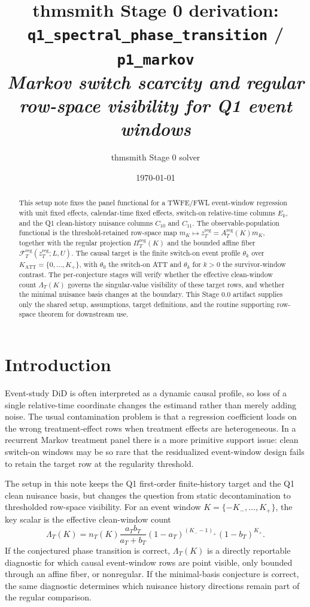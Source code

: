 \documentclass[11pt]{article}
\title{thmsmith Stage 0 derivation: \texttt{q1\_spectral\_phase\_transition} / \texttt{p1\_markov}%
  \\ \large\textit{Markov switch scarcity and regular row-space visibility for Q1 event windows}}
\author{thmsmith Stage 0 solver}
\date{\today}
\theoremstyle{definition}
\theoremstyle{plain}
\theoremstyle{remark}
\begin{document}
\maketitle


\begin{abstract}
This setup note fixes the panel functional for a TWFE/FWL event-window regression with unit fixed effects, calendar-time fixed effects, switch-on relative-time columns \(E_k\), and the Q1 clean-history nuisance columns \(C_{10}\) and \(C_{11}\).
The observable-population functional is the threshold-retained row-space map \(m_K\mapsto z_T^{\mathrm{reg}}=A_T^{\mathrm{reg}}(K)m_K\), together with the regular projection \(\Pi_T^{\mathrm{reg}}(K)\) and the bounded affine fiber \(\mathcal F_T^{\mathrm{reg}}(z_T^{\mathrm{reg}};L,U)\).
The causal target is the finite switch-on event profile \(\theta_k\) over \(K_{\mathrm{ATT}}=\{0,\ldots,K_+\}\), with \(\theta_0\) the switch-on ATT and \(\theta_k\) for \(k>0\) the survivor-window contrast.
The per-conjecture stages will verify whether the effective clean-window count \(\Lambda_T(K)\) governs the singular-value visibility of these target rows, and whether the minimal nuisance basis changes at the boundary.
This Stage 0.0 artifact supplies only the shared setup, assumptions, target definitions, and the routine supporting row-space theorem for downstream use.
\end{abstract}

\section{Introduction}
Event-study DiD is often interpreted as a dynamic causal profile, so loss of a single relative-time coordinate changes the estimand rather than merely adding noise.
The usual contamination problem is that a regression coefficient loads on the wrong treatment-effect rows when treatment effects are heterogeneous.
In a recurrent Markov treatment panel there is a more primitive support issue: clean switch-on windows may be so rare that the residualized event-window design fails to retain the target row at the regularity threshold.

The setup in this note keeps the Q1 first-order finite-history target and the Q1 clean nuisance basis, but changes the question from static decontamination to thresholded row-space visibility.
For an event window \(K=\{-K_-,\ldots,K_+\}\), the key scalar is the effective clean-window count
\[
\Lambda_T(K)=n_T(K)\frac{a_Tb_T}{a_T+b_T}(1-a_T)^{(K_- -1)_+}(1-b_T)^{K_+}.
\]
If the conjectured phase transition is correct, \(\Lambda_T(K)\) is a directly reportable diagnostic for which causal event-window rows are point visible, only bounded through an affine fiber, or nonregular.
If the minimal-basis conjecture is correct, the same diagnostic determines which nuisance history directions remain part of the regular comparison.
\end{document}
